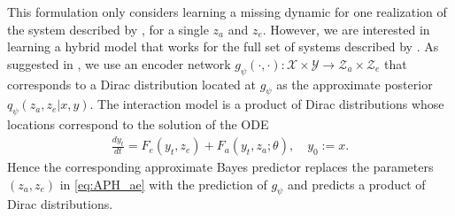 This formulation only considers learning a missing dynamic for one realization of the system described by , for a single $z_a$ and $z_e$. However, we are interested in learning a hybrid model that works for the full set of systems described by . As suggested in \citet{APHYNITY}, we use an encoder network $g_\psi(\cdot, \cdot): \mathcal{X} \times \mathcal{Y} \rightarrow \mathcal{Z}_a \times \mathcal{Z}_e$ that corresponds to a Dirac distribution located at $g_\psi$ as the approximate posterior $q_\psi(z_a, z_e|x, y)$. The interaction model is a product of Dirac distributions whose locations correspond to the solution of the ODE
\begin{align}
    \frac{dy_t}{dt} = F_e(y_t, z_e) + F_a(y_t, z_a; \theta), \quad y_0:=x.
    \label{eq:APH_ae}
\end{align}
Hence the corresponding approximate Bayes predictor replaces the parameters $(z_a, z_e)$ in \eqref{eq:APH_ae} with the prediction of $g_\psi$ and predicts a product of Dirac distributions.

